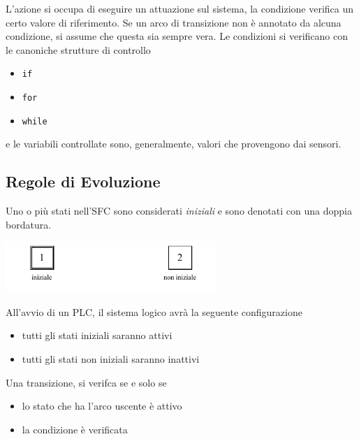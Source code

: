 \documentclass[10pt, letterpaper]{report}
\begin{document}
L'azione si occupa di eseguire un attuazione sul sistema, la condizione verifica un certo valore di riferimento. Se un arco di transizione non è annotato da alcuna condizione, si assume che questa sia sempre vera. Le condizioni si verificano con le canoniche strutture di controllo\begin{itemize}
    \item \texttt{if}
    \item \texttt{for}
    \item \texttt{while}
\end{itemize}
e le variabili controllate sono, generalmente, valori che provengono dai sensori. 
\subsection{Regole di Evoluzione}
Uno o più stati nell'SFC sono considerati \textit{iniziali} e sono denotati con una doppia bordatura.
\begin{center}
    \includegraphics[width=0.6\textwidth ]{images/SFC2.pdf}
\end{center}
All'avvio di un PLC, il sistema logico avrà la seguente configurazione\begin{itemize}
    \item tutti gli stati iniziali saranno attivi 
    \item tutti gli stati non iniziali saranno inattivi 
\end{itemize}
Una transizione, si verifca se e solo se \begin{itemize}
    \item lo stato che ha l'arco uscente è attivo  
    \item la condizione è verificata 
\end{itemize}
\end{document}
